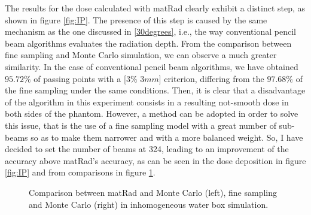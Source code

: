 \documentclass[12pt, a4paper, twoside]{book}
\begin{document}
The results for the dose calculated with matRad clearly exhibit a distinct step, as shown in figure \ref{fig:IP}. The presence of this step is caused by the same mechanism as the one discussed in \ref{30degrees}, i.e., the way conventional pencil beam algorithms evaluates the radiation depth. 
From the comparison between fine sampling and Monte Carlo simulation, we can observe a much greater similarity.
In the case of conventional pencil beam algorithms, we have obtained $95.72\%$ of passing points with a [$3\%$ $3mm$] criterion, differing from the $97.68\%$ of the fine sampling under the same conditions. 
Then, it is clear that a disadvantage of the algorithm in this experiment consists in a resulting not-smooth dose in both sides of the phantom. However, a method can be adopted in order to solve this issue, that is the use of a fine sampling model with a great number of sub-beams so as to make them narrower and with a more balanced weight. So, I have decided to set the number of beams at 324, leading to an improvement of the accuracy above matRad's accuracy, as can be seen in the dose deposition in figure \ref{fig:IP} and from comparisons in figure \ref{fig:IPgam}.
\begin{figure}[!ht]
\centering
{} 
\caption{Comparison between matRad and Monte Carlo (left), fine sampling and Monte Carlo (right) in inhomogeneous water box simulation.}
\label{fig:IPgam}
\end{figure}
\end{document}
